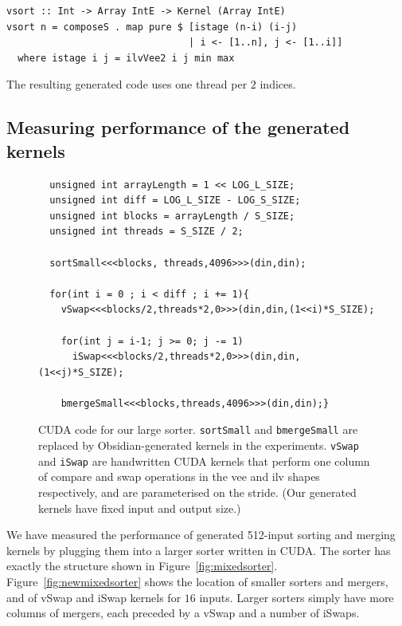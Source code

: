 \begin{codesize}
\begin{verbatim}
vsort :: Int -> Array IntE -> Kernel (Array IntE)
vsort n = composeS . map pure $ [istage (n-i) (i-j) 
                                | i <- [1..n], j <- [1..i]]
  where istage i j = ilvVee2 i j min max
\end{verbatim}
\end{codesize}

\noindent
The resulting generated code uses one thread per
$2$ indices.

\subsection{Measuring performance of the generated kernels}\label{sec:benchmarks}
\begin{figure}
\begin{codesize}
\begin{verbatim}
  unsigned int arrayLength = 1 << LOG_L_SIZE;
  unsigned int diff = LOG_L_SIZE - LOG_S_SIZE;
  unsigned int blocks = arrayLength / S_SIZE;
  unsigned int threads = S_SIZE / 2;
  
  sortSmall<<<blocks, threads,4096>>>(din,din);
 
  for(int i = 0 ; i < diff ; i += 1){ 
    vSwap<<<blocks/2,threads*2,0>>>(din,din,(1<<i)*S_SIZE);
     
    for(int j = i-1; j >= 0; j -= 1)
      iSwap<<<blocks/2,threads*2,0>>>(din,din,(1<<j)*S_SIZE);
      
    bmergeSmall<<<blocks,threads,4096>>>(din,din);}
\end{verbatim}
\end{codesize}
\caption{CUDA code for our large sorter. {\tt sortSmall} and {\tt bmergeSmall}
are replaced by Obsidian-generated kernels in the experiments. {\tt vSwap} and {\tt iSwap} are handwritten CUDA kernels
that perform one column of compare and swap operations in the vee and ilv shapes respectively, and are
parameterised on the stride. (Our generated kernels have fixed input and output size.)}
\label{fig:CUDAsort}
\end{figure}
We have measured the performance of generated 512-input sorting and merging kernels by plugging them into a larger sorter written in CUDA.
The sorter has exactly the structure shown in Figure~\ref{fig:mixedsorter}.
Figure~\ref{fig:newmixedsorter} shows the location of smaller sorters and mergers, and of vSwap and iSwap kernels for $16$ inputs.
Larger sorters simply have more columns of mergers, each preceded by a vSwap and a number of iSwaps.
